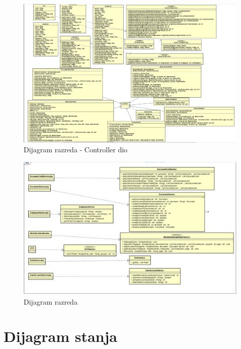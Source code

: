 			\begin{figure}[H]
				\includegraphics[scale=0.50]{slike/Dijagram razreda - Controller.png} %
				\centering
				\caption{Dijagram razreda - Controller dio}
				\label{DR1}
			\end{figure}
			
			
			\begin{figure}[H]
				\includegraphics[scale=0.50]{slike/Dijagram razreda2.png} %
				\centering
				\caption{Dijagram razreda}
				\label{DR1}
			\end{figure}
			
		

			
			\eject
		
		\section{Dijagram stanja}
			
